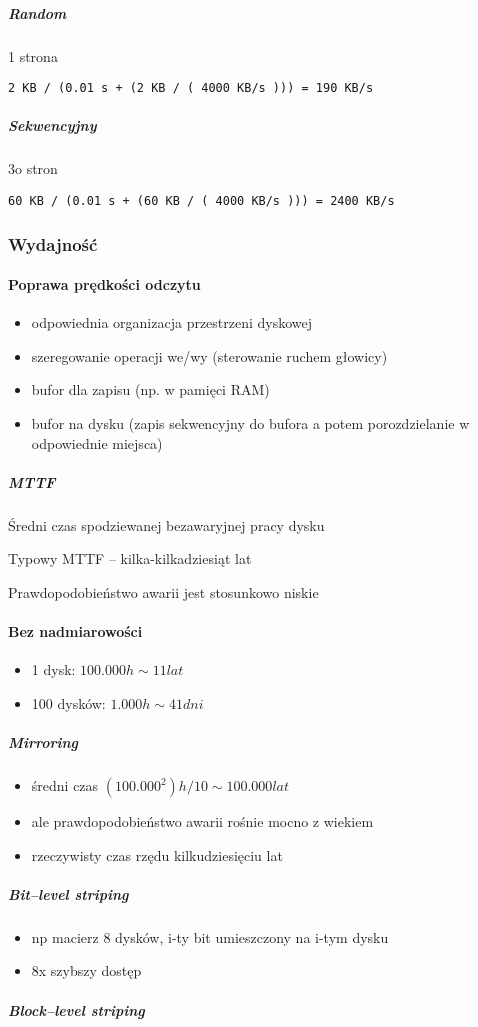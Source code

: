 \documentclass[12pt]{article}
\begin{document}
\subparagraph{Random}
1 strona
\begin{verbatim}
2 KB / (0.01 s + (2 KB / ( 4000 KB/s ))) = 190 KB/s
\end{verbatim}
\subparagraph{Sekwencyjny}
3o stron
\begin{verbatim}
60 KB / (0.01 s + (60 KB / ( 4000 KB/s ))) = 2400 KB/s
\end{verbatim}

\subsubsection{Wydajność}

\paragraph{Poprawa prędkości odczytu}
\begin{itemize}
\item odpowiednia organizacja przestrzeni dyskowej
\item szeregowanie operacji we/wy (sterowanie ruchem głowicy)
\item bufor dla zapisu (np. w pamięci RAM)
\item bufor na dysku (zapis sekwencyjny do bufora a potem porozdzielanie w odpowiednie miejsca)
\end{itemize}

\subparagraph{\ac{MTTF}}
Średni czas spodziewanej bezawaryjnej pracy dysku

Typowy MTTF -- kilka-kilkadziesiąt lat

Prawdopodobieństwo awarii jest stosunkowo niskie

\paragraph{Bez nadmiarowości}
\begin{itemize}
\item 1 dysk: $ 100.000h \sim 11 lat $
\item 100 dysków: $ 1.000h \sim 41dni $
\end{itemize}
\subparagraph{Mirroring}
\begin{itemize}
\item średni czas $ (100.000 ^ 2)h / 10 \sim 100.000 lat $
\item ale prawdopodobieństwo awarii rośnie mocno z wiekiem
\item rzeczywisty czas rzędu kilkudziesięciu lat
\end{itemize}
\subparagraph{Bit--level striping}
\begin{itemize}
\item np macierz 8 dysków, i-ty bit umieszczony na i-tym dysku
\item 8x szybszy dostęp
\end{itemize}
\subparagraph{Block--level striping}
\end{document}
